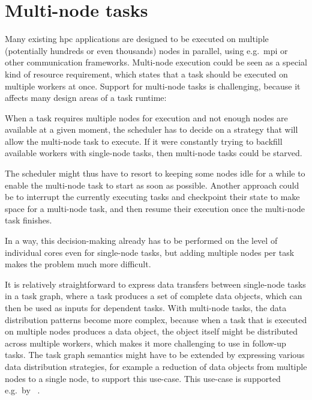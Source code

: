 \section{Multi-node tasks}
\label{sec:multinode-tasks}
Many existing \gls{hpc} applications are designed to be executed on multiple
(potentially hundreds or even thousands) nodes in parallel, using e.g.\ \gls{mpi} or
other communication frameworks. Multi-node execution could be seen as a special kind of resource
requirement, which states that a task should be executed on multiple workers at once. Support for
multi-node tasks is challenging, because it affects many design areas of a task runtime:
\begin{description}[wide=0pt]
	\item[Scheduling] When a task requires multiple nodes for execution and not enough nodes are available at a given
		moment, the scheduler has to decide on a strategy that will allow the multi-node task to execute.
		If it were constantly trying to backfill available workers with single-node tasks, then multi-node
		tasks could be starved.

		The scheduler might thus have to resort to keeping some nodes idle for a while to enable the
		multi-node task to start as soon as possible. Another approach could be to interrupt the currently
		executing tasks and checkpoint their state to make space for a multi-node task, and then resume
		their execution once the multi-node task finishes.

		In a way, this decision-making already has to be performed on the level of individual cores even
		for single-node tasks, but adding multiple nodes per task makes the problem much more difficult.
	\item[Data transfers] It is relatively straightforward to express data transfers between single-node tasks in a task
		graph, where a task produces a set of complete data objects, which can then be used as inputs for
		dependent tasks. With multi-node tasks, the data distribution patterns become more complex, because
		when a task that is executed on multiple nodes produces a data object, the object itself might be
		distributed across multiple workers, which makes it more challenging to use in follow-up tasks. The
		task graph semantics might have to be extended by expressing various data distribution strategies,
		for example a reduction of data objects from multiple nodes to a single node, to support this
		use-case. This use-case is supported e.g.\ by \pycompss~\cite{pycompss}.


\end{description}
